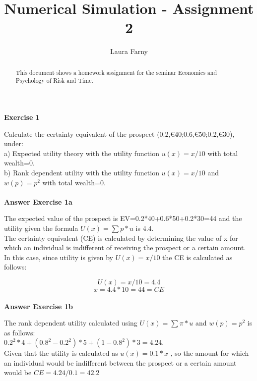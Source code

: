 \documentclass[12pt]{article}
\begin{document}
	
\title{Numerical Simulation - Assignment 2}
\author{Laura Farny}

{}


\begin{abstract}
	This document shows a homework assignment for the seminar Economics and Psychology of Risk and Time.
	
\end{abstract}

\textbf {Exercise 1\\}

Calculate the certainty equivalent of the prospect (0.2,€40;0.6,€50;0.2,€30), under: \\
a) Expected utility theory with the utility function $u(x) =x/10$ with total wealth=0. \\
b) Rank dependent utility with the utility function $u(x) =x/10$ and $w(p) = p^{2}$ with total wealth=0. \\
\\


\textbf {Answer Exercise 1a\\}

The expected value of the prospect is EV=0.2*40+0.6*50+0.2*30=44 and the utility given the formula $U(x)=\sum p*u$ is 4.4.\\
The certainty equivalent (CE) is calculated by determining the value of x for which an individual is indifferent of receiving the prospect or a certain amount. In this case, since utility is given by $U(x)=x/10$  the CE is calculated as follows:

\[U(x)=x/10 =4.4\]
\[x=4.4*10=44=CE\]\\


\textbf {Answer Exercise 1b\\}

The rank dependent utility calculated using $U(x)=\sum \pi *u$ and $w(p)=p^{2}$ is as follows: \\
\(0.2^{2}*4 + (0.8^{2}-0.2^{2})*5 + (1-0.8^{2})*3 = 4.24\). \\
Given that the utility is calculated as $u(x)=0.1*x$ , so the amount for which an individual would be indifferent between the prospect or a certain amount would be $CE=4.24/0.1=42.2$\\
\\
\\
\end{document}
